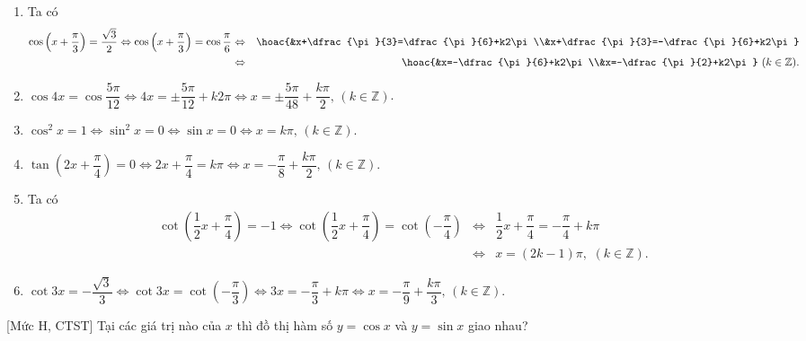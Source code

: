 \begin{bt}
{\begin{enumerate}
			\item Ta có
			\allowdisplaybreaks
			\begin{eqnarray*}
				\cos \left(x+\dfrac{\pi}{3}\right) = \dfrac{\sqrt{3}}{2} \Leftrightarrow \cos\left(x+\dfrac{\pi}{3}\right)=\cos\dfrac{\pi}{6} &\Leftrightarrow& \hoac{&x+\dfrac{\pi}{3}=\dfrac{\pi}{6}+k2\pi\\&x+\dfrac{\pi}{3}=-\dfrac{\pi}{6}+k2\pi}\\
				&\Leftrightarrow& \hoac{&x=-\dfrac{\pi}{6}+k2\pi\\&x=-\dfrac{\pi}{2}+k2\pi}\,\,(k\in\mathbb{Z}).
			\end{eqnarray*}
			\item $\cos 4 x=\cos \dfrac{5 \pi}{12}\Leftrightarrow4x=\pm\dfrac{5\pi}{12}+k2\pi\Leftrightarrow x=\pm\dfrac{5\pi}{48}+\dfrac{k\pi}{2},\,(k\in\mathbb{Z})$.
			\item $\cos^2x=1\Leftrightarrow\sin^2x=0\Leftrightarrow\sin x=0\Leftrightarrow x=k\pi,\,(k\in\mathbb{Z})$.
			\item $\tan \left(2 x+\dfrac{\pi}{4}\right)=0\Leftrightarrow2x+\dfrac{\pi}{4}=k\pi\Leftrightarrow x=-\dfrac{\pi}{8}+\dfrac{k\pi}{2},\,(k\in\mathbb{Z})$.
			\item Ta có
			\allowdisplaybreaks
			\begin{eqnarray*}
				\cot \left(\dfrac{1}{2} x+\dfrac{\pi}{4}\right)=-1 \Leftrightarrow \cot\left(\dfrac{1}{2}x+\dfrac{\pi}{4}\right)=\cot\left(-\dfrac{\pi}{4}\right) &\Leftrightarrow& \dfrac{1}{2}x+\dfrac{\pi}{4}=-\dfrac{\pi}{4}+k\pi\\
				&\Leftrightarrow& x=(2k-1)\pi,\,\,(k\in\mathbb{Z}).
			\end{eqnarray*}
			\item $\cot3x=-\dfrac{\sqrt{3}}{3}\Leftrightarrow\cot3x=\cot\left(-\dfrac{\pi}{3}\right)\Leftrightarrow3x=-\dfrac{\pi}{3}+k\pi\Leftrightarrow x=-\dfrac{\pi}{9}+\dfrac{k\pi}{3},\,(k\in\mathbb{Z})$.
		\end{enumerate}
	}
\end{bt}

\begin{bt}%
[Mức H, CTST]%
	Tại các giá trị nào của $x$ thì đồ thị hàm số $y=\cos x$ và $y=\sin x$ giao nhau?
\end{bt}

